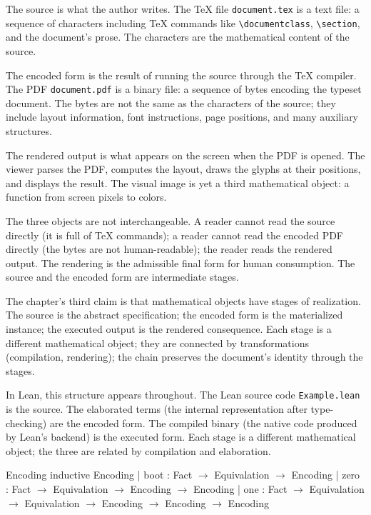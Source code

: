The source is what the author writes. The TeX file
\texttt{document.tex} is a text file: a sequence of characters
including TeX commands like \texttt{\textbackslash documentclass},
\texttt{\textbackslash section}, and the document's prose. The
characters are the mathematical content of the source.

The encoded form is the result of running the source through the
TeX compiler. The PDF \texttt{document.pdf} is a binary file: a
sequence of bytes encoding the typeset document. The bytes are
not the same as the characters of the source; they include
layout information, font instructions, page positions, and many
auxiliary structures.

The rendered output is what appears on the screen when the PDF is
opened. The viewer parses the PDF, computes the layout, draws the
glyphs at their positions, and displays the result. The visual
image is yet a third mathematical object: a function from screen
pixels to colors.

The three objects are not interchangeable. A reader cannot read
the source directly (it is full of TeX commands); a reader cannot
read the encoded PDF directly (the bytes are not human-readable);
the reader reads the rendered output. The rendering is the
admissible final form for human consumption. The source and the
encoded form are intermediate stages.

The chapter's third claim is that mathematical objects have stages
of realization. The source is the abstract specification; the
encoded form is the materialized instance; the executed output is
the rendered consequence. Each stage is a different mathematical
object; they are connected by transformations (compilation,
rendering); the chain preserves the document's identity through
the stages.

In Lean, this structure appears throughout. The Lean source code
\texttt{Example.lean} is the source. The elaborated terms (the
internal representation after type-checking) are the encoded
form. The compiled binary (the native code produced by Lean's
backend) is the executed form. Each stage is a different
mathematical object; the three are related by compilation and
elaboration.

\begin{leanexcerpt}{Encoding}
inductive Encoding
  | boot : Fact $\to$ Equivalation $\to$ Encoding
  | zero : Fact $\to$ Equivalation $\to$ Encoding $\to$ Encoding
  | one  : Fact $\to$ Equivalation $\to$ Equivalation
        $\to$ Encoding $\to$ Encoding $\to$ Encoding
\end{leanexcerpt}


